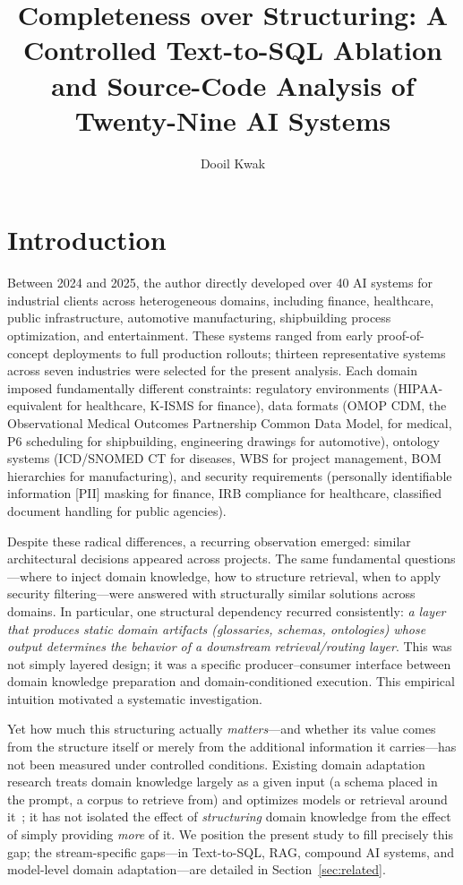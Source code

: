 \documentclass[fleqn,10pt,lineno]{wlpeerj}
\title{Completeness over Structuring: A Controlled Text-to-SQL Ablation and Source-Code Analysis of Twenty-Nine AI Systems}
\author[1]{Dooil Kwak}
\affil[1]{Department of AI Techno Convergence, Graduate School, Soongsil University, Seoul, Republic of Korea}
\begin{document}
\raggedbottom
\maketitle
\thispagestyle{empty}
\section{Introduction}

Between 2024 and 2025, the author directly developed over 40 AI systems for industrial clients across heterogeneous domains, including finance, healthcare, public infrastructure, automotive manufacturing, shipbuilding process optimization, and entertainment. These systems ranged from early proof-of-concept deployments to full production rollouts; thirteen representative systems across seven industries were selected for the present analysis. Each domain imposed fundamentally different constraints: regulatory environments (HIPAA-equivalent for healthcare, K-ISMS for finance), data formats (OMOP CDM, the Observational Medical Outcomes Partnership Common Data Model, for medical, P6 scheduling for shipbuilding, engineering drawings for automotive), ontology systems (ICD/SNOMED CT for diseases, WBS for project management, BOM hierarchies for manufacturing), and security requirements (personally identifiable information [PII] masking for finance, IRB compliance for healthcare, classified document handling for public agencies).

Despite these radical differences, a recurring observation emerged: similar architectural decisions appeared across projects. The same fundamental questions---where to inject domain knowledge, how to structure retrieval, when to apply security filtering---were answered with structurally similar solutions across domains. In particular, one structural dependency recurred consistently: \textit{a layer that produces static domain artifacts (glossaries, schemas, ontologies) whose output determines the behavior of a downstream retrieval/routing layer}. This was not simply layered design; it was a specific producer--consumer interface between domain knowledge preparation and domain-conditioned execution. This empirical intuition motivated a systematic investigation.

Yet how much this structuring actually \textit{matters}---and whether its value comes from the structure itself or merely from the additional information it carries---has not been measured under controlled conditions. Existing domain adaptation research treats domain knowledge largely as a given input (a schema placed in the prompt, a corpus to retrieve from) and optimizes models or retrieval around it~\citep{finsql,ehrsql,korquad}; it has not isolated the effect of \textit{structuring} domain knowledge from the effect of simply providing \textit{more} of it. We position the present study to fill precisely this gap; the stream-specific gaps---in Text-to-SQL, RAG, compound AI systems, and model-level domain adaptation---are detailed in Section~\ref{sec:related}.
\end{document}
